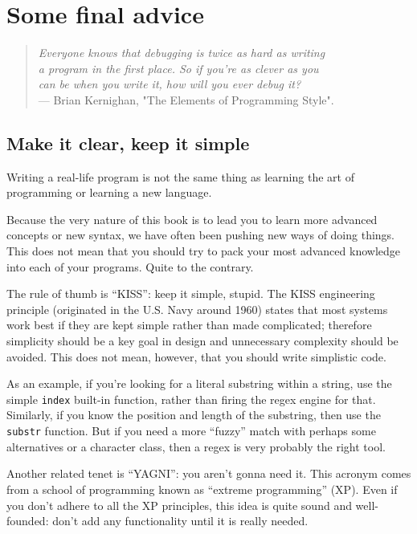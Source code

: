 \chapter{Some final advice}

\begin{quote}
\raggedleft 
\emph{Everyone knows that debugging is twice as hard as writing \\ 
a program in the first place. So if you're as clever as you \\
can be when you write it, how will you ever debug it? }\\
--- Brian Kernighan, "The Elements of Programming Style".
\end{quote}

\section{Make it clear, keep it simple}

Writing a real-life program is not the same thing as learning 
the art of programming or learning a new language.

Because the very nature of this book is to lead you to learn 
more advanced concepts or new syntax, we have often been 
pushing new ways of doing things. This does not mean that 
you should try to pack your most advanced knowledge into 
each of your programs. Quite to the contrary.

The rule of thumb is ``KISS'': keep it simple, stupid. The 
KISS engineering principle (originated in the U.S. Navy 
around 1960) states that most systems work best if they 
are kept simple rather than made complicated; therefore 
simplicity should be a key goal in design and unnecessary 
complexity should be avoided. This does not mean, however, 
that you should write simplistic code.

As an example, if you're looking for a literal substring 
within a string, use the simple {\tt index} built-in function, 
rather than firing the regex engine for that. Similarly, 
if you know the position and length of the substring, then 
use the {\tt substr} function. But if you need a more ``fuzzy'' 
match with perhaps some alternatives or a character class, then 
a regex is very probably the right tool.

Another related tenet is ``YAGNI'': you  aren't gonna need 
it. This acronym comes from a school of programming 
known as ``extreme programming'' (XP). Even if you don't 
adhere to all the XP principles, this idea is quite sound 
and well-founded: don't add any functionality until it is 
really needed.

